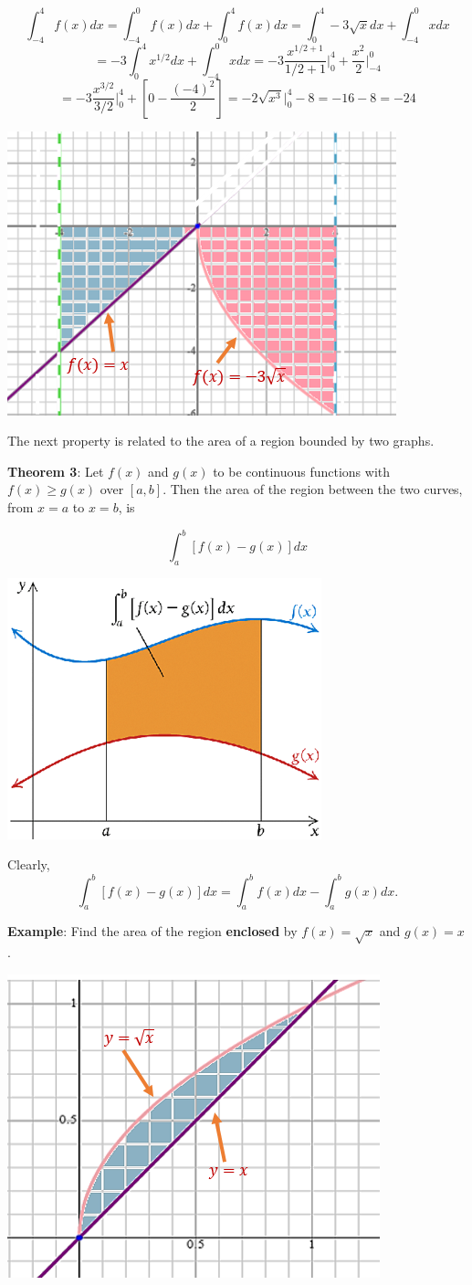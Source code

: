 \documentclass[
]{book}
\begin{document}
\[
\int_{-4}^4 f(x) dx = \int_{-4}^0 f(x) dx + \int_0^4 f(x) dx =\int_0^4 -3\sqrt{x} dx + \int_{-4}^0 xdx
\]
\[
= -3\int_0^4 x^{1/2}dx + \int_{-4}^0 x dx =-3 \frac{x^{1/2+1}}{1/2+1}\Big|_0^4 +\frac{x^2}{2}\Big|_{-4}^0 
\]
\[
=-3\frac{x^{3/2}}{3/2}\Big|_0^4 + \left[0 - \frac{(-4)^2}{2}\right]=-2\sqrt{x^3}\Big|_0^4 - 8 = -16 -8 = -24
\]

\begin{center}\includegraphics[width=0.45\linewidth]{img12/example3-figure} \end{center}

\hfill\break

The next property is related to the area of a region bounded by two graphs.

\hfill\break

\textbf{Theorem 3}: Let \(f(x)\) and \(g(x)\) to be continuous functions with \(f(x) \ge g(x)\) over \([a, b]\). Then the area of the region between the two curves, from \(x = a\) to \(x = b\), is

\[
\int_a^b [f(x) - g(x)] dx
\]

\begin{center}\includegraphics[width=0.45\linewidth]{img12/areaBetween2Curves} \end{center}

Clearly,
\[
\int_a^b [f(x) - g(x)] dx = \int_a^b f(x) dx - \int_a^b g(x) dx.
\]

\textbf{Example}: Find the area of the region \textbf{enclosed} by \(f(x) = \sqrt{x}\) and \(g(x) = x\).

\begin{center}\includegraphics[width=0.45\linewidth]{img12/example4Figure} \end{center}
\end{document}

